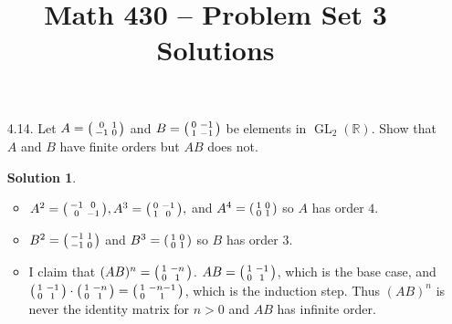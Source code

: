 \documentclass{article}
\title{Math 430 -- Problem Set 3 Solutions}
\date{}
\newcommand{\RR}{\mathbb{R}}
\DeclareMathOperator{\GL}{GL}
\theoremstyle{definition}
\newtheorem*{solution}{Solution}
\begin{document}
\maketitle


\begin{enumerate}
\item[4.14.] Let $A = \begin{psmallmatrix} 0 & 1 \\ -1 & 0 \end{psmallmatrix}$ and $B = \begin{psmallmatrix} 0 & -1 \\ 1 & -1 \end{psmallmatrix}$ be elements in $\GL_2(\RR)$.  Show that $A$ and $B$ have finite orders but $AB$ does not.
\begin{solution} $ $
\begin{itemize}
\item $A^2 = \begin{psmallmatrix} -1 & 0 \\ 0 & -1 \end{psmallmatrix}, A^3 = \begin{psmallmatrix} 0 & -1 \\ 1 & 0 \end{psmallmatrix},$ and $A^4 = \begin{psmallmatrix} 1 & 0 \\ 0 & 1 \end{psmallmatrix}$ so $A$ has order $4$.
\item $B^2 = \begin{psmallmatrix} -1 & 1 \\ -1 & 0 \end{psmallmatrix}$ and $B^3 = \begin{psmallmatrix} 1 & 0 \\ 0 & 1 \end{psmallmatrix}$ so $B$ has order $3$.
\item I claim that $(AB)^n = \begin{psmallmatrix} 1 & -n \\ 0 & 1 \end{psmallmatrix}$.  $AB = \begin{psmallmatrix} 1 & -1 \\ 0 & 1 \end{psmallmatrix}$, which is the base case, and $\begin{psmallmatrix} 1 & -1 \\ 0 & 1 \end{psmallmatrix} \cdot \begin{psmallmatrix} 1 & -n \\ 0 & 1 \end{psmallmatrix} = \begin{psmallmatrix} 1 & -n-1 \\ 0 & 1 \end{psmallmatrix}$, which is the induction step.  Thus $(AB)^n$ is never the identity matrix for $n>0$ and $AB$ has infinite order.

\end{itemize}
\end{solution}
\end{enumerate}
\end{document}
